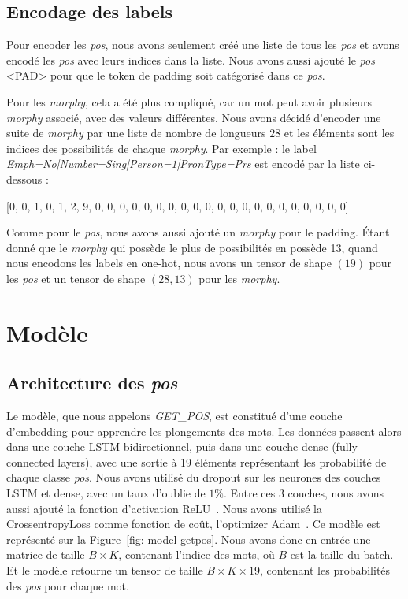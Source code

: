 \documentclass[a4paper]{article}
\begin{document}
\subsection{Encodage des labels}

Pour encoder les \textit{pos}, nous avons seulement créé une liste de tous les \textit{pos} et avons encodé les \textit{pos} avec 
leurs indices dans la liste.
Nous avons aussi ajouté le \textit{pos} <PAD> pour que le token de padding soit catégorisé dans ce \textit{pos}.


Pour les \textit{morphy}, cela a été plus compliqué, car un mot peut avoir plusieurs \textit{morphy} associé, avec des valeurs
différentes. Nous avons décidé d'encoder une suite de \textit{morphy} par une liste de nombre de longueurs $28$ et les éléments
sont les indices des possibilités de chaque
\textit{morphy}. Par exemple : le label \textit{Emph=No|Number=Sing|Person=1|PronType=Prs} est encodé par la liste ci-dessous :

[0, 0, 1, 0, 1, 2, 9, 0, 0, 0, 0, 0, 0, 0, 0, 0, 0, 0, 0, 0, 0, 0, 0, 0, 0, 0, 0, 0]

Comme pour le \textit{pos}, nous avons aussi ajouté un \textit{morphy} pour le padding. Étant donné que le \textit{morphy} qui possède
le plus de possibilités en possède 13, quand nous encodons les labels en one-hot, nous avons un tensor de shape
$(19)$ pour les \textit{pos} et un tensor de shape $(28, 13)$ pour les \textit{morphy}.


\section{Modèle}

\subsection{Architecture des \textit{pos}}

Le modèle, que nous appelons \textit{GET\_POS}, est constitué d'une couche d'embedding pour apprendre les plongements
des mots. Les données passent alors dans une couche LSTM bidirectionnel, puis dans une couche dense (fully connected layers),
avec une sortie à 19 éléments représentant les probabilité de chaque classe \textit{pos}. Nous avons utilisé du 
dropout sur les neurones des couches LSTM et dense, avec un taux d'oublie de $1\%$. Entre ces 3 couches, nous avons 
aussi ajouté la fonction d'activation ReLU~\cite{DBLP:journals/corr/abs-1803-08375}. Nous avons utilisé la CrossentropyLoss 
comme fonction de coût, l'optimizer Adam~\cite{kingma2014adam}. Ce modèle est représenté sur la Figure~\ref{fig: model getpos}.
Nous avons donc en entrée une matrice de taille $B \times K$, contenant l'indice des mots, où $B$ est la taille du batch.
 Et le modèle retourne un tensor de taille $B \times K \times 19$, contenant les probabilités des \textit{pos} pour chaque mot.
\end{document}
